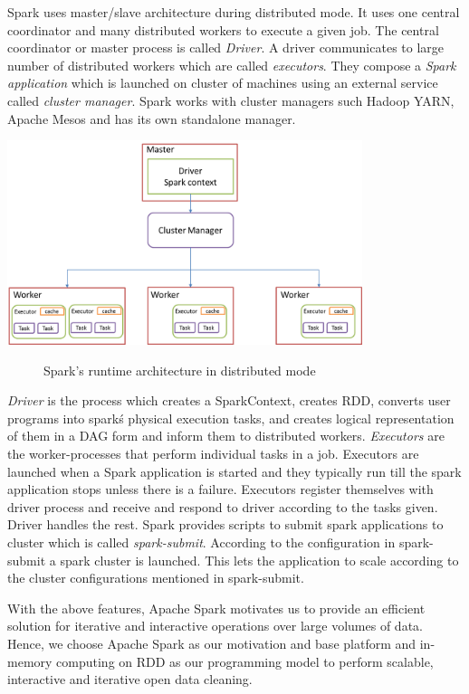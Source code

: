 Spark uses master/slave architecture during distributed mode. It uses one central coordinator and many distributed workers to execute a given job. The central coordinator or master process is called \textit{Driver}. A driver communicates to large number of distributed workers which are called \textit{executors}. They compose a \textit{Spark application} which is launched on cluster of machines using an external service called \textit{cluster manager}. Spark works with cluster managers such Hadoop YARN, Apache Mesos and has its own standalone manager. 
\begin{center}
	\includegraphics[width=28em]{./Figures/spark-master-slave}
	\begin{figure}[htbp]
    \caption{Spark's runtime architecture in distributed mode}
    \label{fig:spark-masterslave}
	\end{figure}
\end{center}
\textit{Driver} is the process which creates a SparkContext, creates RDD, converts user programs into spark\'s physical execution tasks, and creates logical representation of them in a DAG form and inform them to distributed workers. \textit{Executors} are the worker-processes that perform individual tasks in a job. Executors are launched when a Spark application is started and they typically run till the spark application stops unless there is a failure. Executors register themselves with driver process and receive and respond to driver according to the tasks given. Driver handles the rest.  Spark provides scripts to submit spark applications to cluster which is called \textit{spark-submit}. According to the configuration in spark-submit a spark cluster is launched. This lets the application to scale according to the cluster configurations mentioned in spark-submit. 

With the above features, Apache Spark motivates us to provide an efficient solution for iterative and interactive operations over large volumes of data. Hence, we choose Apache Spark as our motivation and base platform and in-memory computing on RDD as our programming model to perform scalable, interactive and iterative open data cleaning.

